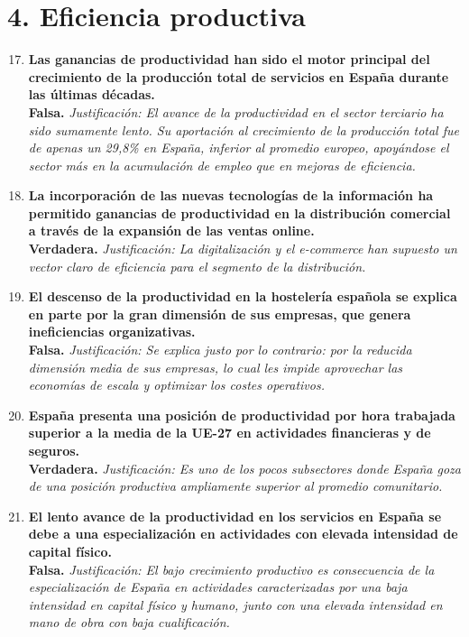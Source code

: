 \section*{4. Eficiencia productiva}

\begin{enumerate}[label=\textbf{\arabic*.}]
    \setcounter{enumi}{16}

    \item \textbf{Las ganancias de productividad han sido el motor principal del crecimiento de la producción total de servicios en España durante las últimas décadas.} \\
    \textbf{Falsa.} \textit{Justificación: El avance de la productividad en el sector terciario ha sido sumamente lento. Su aportación al crecimiento de la producción total fue de apenas un 29,8\% en España, inferior al promedio europeo, apoyándose el sector más en la acumulación de empleo que en mejoras de eficiencia.}

    \item \textbf{La incorporación de las nuevas tecnologías de la información ha permitido ganancias de productividad en la distribución comercial a través de la expansión de las ventas online.} \\
    \textbf{Verdadera.} \textit{Justificación: La digitalización y el e-commerce han supuesto un vector claro de eficiencia para el segmento de la distribución.}

    \item \textbf{El descenso de la productividad en la hostelería española se explica en parte por la gran dimensión de sus empresas, que genera ineficiencias organizativas.} \\
    \textbf{Falsa.} \textit{Justificación: Se explica justo por lo contrario: por la reducida dimensión media de sus empresas, lo cual les impide aprovechar las economías de escala y optimizar los costes operativos.}

    \item \textbf{España presenta una posición de productividad por hora trabajada superior a la media de la UE-27 en actividades financieras y de seguros.} \\
    \textbf{Verdadera.} \textit{Justificación: Es uno de los pocos subsectores donde España goza de una posición productiva ampliamente superior al promedio comunitario.}

    \item \textbf{El lento avance de la productividad en los servicios en España se debe a una especialización en actividades con elevada intensidad de capital físico.} \\
    \textbf{Falsa.} \textit{Justificación: El bajo crecimiento productivo es consecuencia de la especialización de España en actividades caracterizadas por una baja intensidad en capital físico y humano, junto con una elevada intensidad en mano de obra con baja cualificación.}


\end{enumerate}
